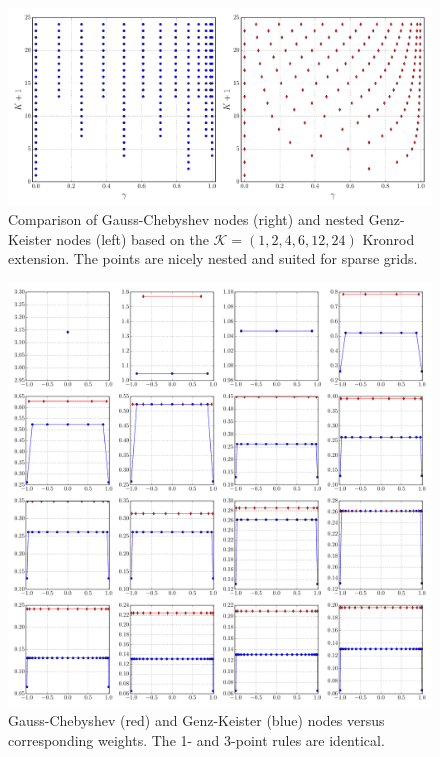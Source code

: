 \documentclass[a4paper,10pt]{article}
\begin{document}
\begin{figure}[h]
  \centering
  \includegraphics[width=\linewidth]{./img/gk_chebyshevt_nodes_cmp.pdf}
  \caption{Comparison of Gauss-Chebyshev nodes (right) and nested Genz-Keister nodes (left)
  based on the $\mathcal{K} = (1, 2, 4, 6, 12, 24)$ Kronrod extension.
  The points are nicely nested and suited for sparse grids.}
  \label{fig:gk_chebyshevt_nodes_cmp}
\end{figure}

\begin{figure}[h]
  \centering
  \includegraphics[width=\linewidth]{./img/gk_chebyshevt_nodes_1d.pdf}
  \caption{Gauss-Chebyshev (red) and Genz-Keister (blue) nodes versus
  corresponding weights. The 1- and 3-point rules are identical.}
  \label{fig:gk_chebyshevt_nodes_1d}
\end{figure}
\end{document}

